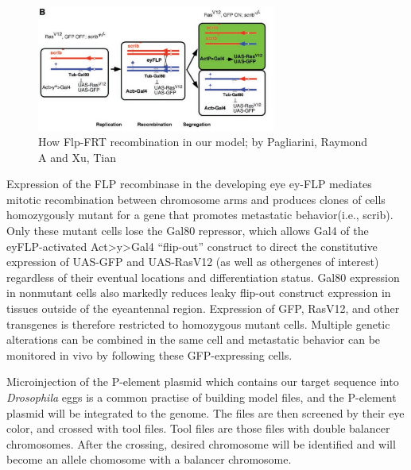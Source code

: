 \begin{figure}[H]
    \centering
    \includegraphics[width=0.7\textwidth]{image/FRT_RAS.png}
    \caption{How Flp-FRT recombination in our model; by Pagliarini, Raymond A and Xu, Tian}
    \label{FRT-RAS}
\end{figure}

Expression of the FLP recombinase in the developing eye ey-FLP mediates mitotic recombination between chromosome arms and produces clones of cells homozygously mutant for a gene that promotes metastatic behavior(i.e., scrib). Only these mutant cells lose the Gal80 repressor, which allows Gal4 of the eyFLP-activated Act>y>Gal4 “flip-out” construct to direct the constitutive expression of UAS-GFP and UAS-RasV12 (as well as othergenes of interest) regardless of their eventual locations and differentiation status. Gal80 expression in nonmutant cells also markedly reduces leaky flip-out construct expression in tissues outside of the eyeantennal region. Expression of GFP, RasV12, and other transgenes is therefore restricted to homozygous mutant cells. Multiple genetic alterations can be combined in the same cell and metastatic behavior can be monitored in vivo by following these GFP-expressing cells.\cite{pagliarini2003genetic}

Microinjection of the P-element plasmid which contains our target sequence into \textit{Drosophila} eggs is a common practise of building model files, and the P-element plasmid will be integrated to the genome. The files are then screened by their eye color, and crossed with tool files. Tool files are those files with double balancer chromosomes. After the crossing, desired chromosome will be identified and will become an allele chomosome with a balancer chromosome.

